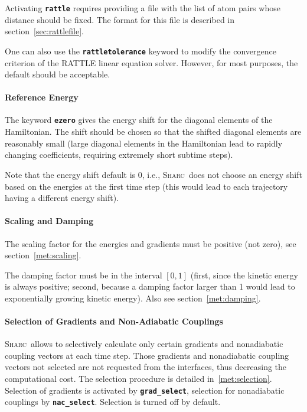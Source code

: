 \documentclass[a4paper,10pt,DIV=15,openany]{scrbook}
\newcommand{\sharc}{\textsc{Sharc}}
\newcommand{\ttt}[1]{\textbf{\texttt{#1}}}
\begin{document}
Activating \ttt{rattle} requires providing a file with the list of atom pairs whose distance should be fixed.
The format for this file is described in section~\ref{sec:rattlefile}. 

One can also use the \ttt{rattletolerance} keyword to modify the convergence criterion of the RATTLE linear equation solver.
However, for most purposes, the default should be acceptable.



\paragraph{Reference Energy}

The keyword \ttt{ezero} gives the energy shift for the diagonal elements of the Hamiltonian. The shift should be chosen so that the shifted diagonal elements are reasonably small (large diagonal elements in the Hamiltonian lead to rapidly changing coefficients, requiring extremely short subtime steps). 

Note that the energy shift default is 0, i.e., \sharc\ does not choose an energy shift based on the energies at the first time step (this would lead to each trajectory having a different energy shift).

\paragraph{Scaling and Damping}

The scaling factor for the energies and gradients must be positive (not zero), see section~\ref{met:scaling}.

The damping factor must be in the interval $[0,1]$ (first, since the kinetic energy is always positive; second, because a damping factor larger than 1 would lead to exponentially growing kinetic energy). Also see section~\ref{met:damping}.

\paragraph{Selection of Gradients and Non-Adiabatic Couplings}

\sharc\ allows to selectively calculate only certain gradients and nonadiabatic coupling vectors at each time step. Those gradients and nonadiabatic coupling vectors not selected are not requested from the interfaces, thus decreasing the computational cost. The selection procedure is detailed in~\ref{met:selection}.
Selection of gradients is activated by \ttt{grad\_select}, selection for nonadiabatic couplings by \ttt{nac\_select}. Selection is turned off by default. 
\end{document}
